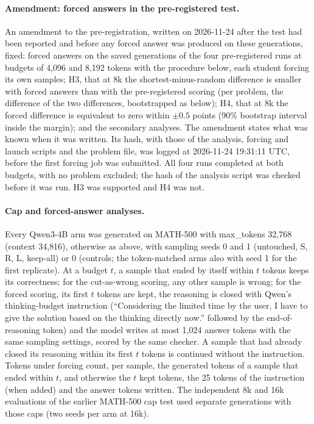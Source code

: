 \documentclass[10pt]{article}
\begin{document}
\paragraph{Amendment: forced answers in the pre-registered test.} An amendment to the pre-registration, written on 2026-11-24 after the test had been reported and before any forced answer was produced on these generations, fixed: forced answers on the saved generations of the four pre-registered runs at budgets of 4{,}096 and 8{,}192 tokens with the procedure below, each student forcing its own samples; H3, that at 8k the shortest-minus-random difference is smaller with forced answers than with the pre-registered scoring (per problem, the difference of the two differences, bootstrapped as below); H4, that at 8k the forced difference is equivalent to zero within $\pm0.5$ points (90\% bootstrap interval inside the margin); and the secondary analyses. The amendment states what was known when it was written. Its hash, with those of the analysis, forcing and launch scripts and the problem file, was logged at 2026-11-24 19:31:11 UTC, before the first forcing job was submitted. All four runs completed at both budgets, with no problem excluded; the hash of the analysis script was checked before it was run. H3 was supported and H4 was not.

\paragraph{Cap and forced-answer analyses.} Every Qwen3-4B arm was generated on MATH-500 with max\_tokens 32{,}768 (context 34{,}816), otherwise as above, with sampling seeds 0 and 1 (untouched, S, R, L, keep-all) or 0 (controls; the token-matched arms also with seed 1 for the first replicate). At a budget $t$, a sample that ended by itself within $t$ tokens keeps its correctness; for the cut-as-wrong scoring, any other sample is wrong; for the forced scoring, its first $t$ tokens are kept, the reasoning is closed with Qwen's thinking-budget instruction (``Considering the limited time by the user, I have to give the solution based on the thinking directly now.'' followed by the end-of-reasoning token) and the model writes at most 1{,}024 answer tokens with the same sampling settings, scored by the same checker. A sample that had already closed its reasoning within its first $t$ tokens is continued without the instruction. Tokens under forcing count, per sample, the generated tokens of a sample that ended within $t$, and otherwise the $t$ kept tokens, the 25 tokens of the instruction (when added) and the answer tokens written. The independent 8k and 16k evaluations of the earlier MATH-500 cap test used separate generations with those caps (two seeds per arm at 16k).
\end{document}
